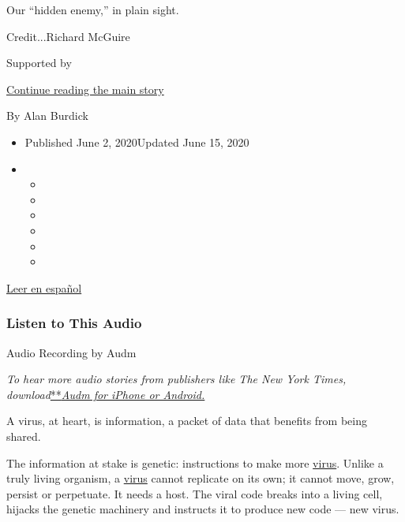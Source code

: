 Our ``hidden enemy,'' in plain sight.

Credit...Richard McGuire

Supported by

\protect\hyperlink{after-sponsor}{Continue reading the main story}

By Alan Burdick

\begin{itemize}
\item
  Published June 2, 2020Updated June 15, 2020
\item
  \begin{itemize}
  \item
  \item
  \item
  \item
  \item
  \item
  \end{itemize}
\end{itemize}

\href{https://www.nytimes.com/es/2020/06/02/espanol/ciencia-y-tecnologia/perfil-coronavirus-covid.html}{Leer
en español}

\hypertarget{listen-to-this-audio}{%
\subsubsection{Listen to This Audio}\label{listen-to-this-audio}}

Audio Recording by Audm

\emph{To hear more audio stories from publishers like The New York
Times,
download}\href{https://www.audm.com/?utm_source=nytmag\&utm_medium=embed\&utm_campaign=left_behind_draper}{**}\href{https://www.audm.com/?utm_source=nyt\&utm_medium=embed\&utm_campaign=monster_or_machine}{\emph{Audm
for iPhone or Android.}}

A virus, at heart, is information, a packet of data that benefits from
being shared.

The information at stake is genetic: instructions to make more
\href{https://www.nytimes.com/2020/06/15/health/coronavirus-underlying-conditions.html}{virus}.
Unlike a truly living organism, a
\href{https://www.nytimes.com/2020/06/15/health/coronavirus-underlying-conditions.html}{virus}
cannot replicate on its own; it cannot move, grow, persist or
perpetuate. It needs a host. The viral code breaks into a living cell,
hijacks the genetic machinery and instructs it to produce new code ---
new virus.

